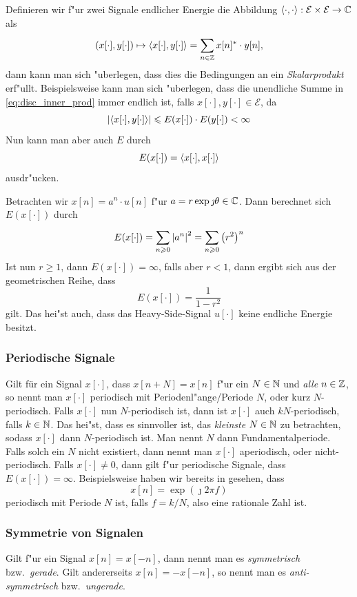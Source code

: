 Definieren wir f"ur zwei Signale endlicher Energie die Abbildung ${\left\langle \cdot,\cdot \right\rangle} : \mathcal{E} \times \mathcal{E} \rightarrow \mathbb{C}$ als
\begin{equation}\label{eq:disc_inner_prod}
    (x[\cdot], y[\cdot]) 
        \mapsto {\left\langle x[\cdot],y[\cdot] \right\rangle}
        = {\sum\limits_{n \in \mathbb{Z}}^{}{x[n]^\ast \cdot y[n]}},
\end{equation}
dann kann man sich "uberlegen, dass dies die Bedingungen an ein \emph{Skalarprodukt} erf"ullt.
Beispielsweise kann man sich "uberlegen, dass die unendliche Summe in \eqref{eq:disc_inner_prod} immer endlich ist, falls $x[\cdot], y[\cdot] \in \mathcal{E}$, da
\[
{\left| {\left\langle x[\cdot],y[\cdot] \right\rangle} \right|} \leqslant E(x[\cdot]) \cdot E(y[\cdot]) < \infty
\]
Nun kann man aber auch $E$ durch
\[
E(x[\cdot]) = {\left\langle x[\cdot],x[\cdot] \right\rangle}
\] 
ausdr"ucken.

\begin{Bsp}
Betrachten wir $x[n] = a^n \cdot u[n]$ f"ur $a = r \exp{\jmath \theta} \in \mathbb{C}$.
Dann berechnet sich $E(x[\cdot])$ durch
\[
E(x[\cdot]) 
    = {\sum\limits_{n \geqslant 0}^{}{{\left| a^n \right|}^2}} 
    = {\sum\limits_{n \geqslant 0}^{}{\left(r^2\right)^n}}
\]
Ist nun $r \geqslant 1$, dann $E(x[\cdot]) = \infty$, falls aber $r < 1$, dann ergibt sich aus der geometrischen Reihe, dass
\[
    E(x[\cdot]) = \frac{1}{1 - r^2}
\]
gilt.
Das hei"st auch, dass das Heavy-Side-Signal $u[\cdot]$ keine endliche Energie besitzt.
\end{Bsp}
%
\subsubsection{Periodische Signale}
%
Gilt f\"ur ein Signal $x[\cdot]$, dass $x[n + N] = x[n]$ f"ur ein $N \in \mathbb{N}$ und \emph{alle} $n \in \mathbb{Z}$, so nennt man $x[\cdot]$ periodisch mit Periodenl"ange/Periode $N$, oder kurz $N$-periodisch.
Falls $x[\cdot]$ nun $N$-periodisch ist, dann ist $x[\cdot]$ auch $kN$-periodisch, falls $k \in \mathbb{N}$.
Das hei"st, dass es sinnvoller ist, das \emph{kleinste} $N \in \mathbb{N}$ zu betrachten, sodass $x[\cdot]$ dann $N$-periodisch ist. 
Man nennt $N$ dann Fundamentalperiode.
Falls solch ein $N$ nicht existiert, dann nennt man $x[\cdot]$ aperiodisch, oder nicht-periodisch.
Falls $x[\cdot] \neq 0$, dann gilt f"ur periodische Signale, dass $E(x[\cdot]) = \infty$.
Beispielsweise haben wir bereits in  gesehen, dass
\[
x[n] = \exp(\jmath 2 \pi f)
\]
periodisch mit Periode $N$ ist, falls $f = k/N$, also eine rationale Zahl ist.
%
\subsubsection{Symmetrie von Signalen}
%
Gilt f"ur ein Signal $x[n] = x[-n]$, dann nennt man es \emph{symmetrisch} bzw.~\emph{gerade}.
Gilt andererseits $x[n] = -x[-n]$, so nennt man es \emph{anti-symmetrisch} bzw.~\emph{ungerade}.


